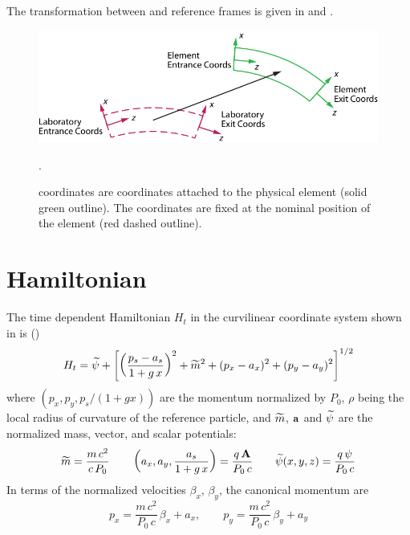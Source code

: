 The transformation between  and  reference frames is given in
 and .


\begin{figure}[tb]
  \centering
  \includegraphics[width=5in]{coord-offset.pdf}
  \caption[Element Coordinate System.]
  {
 coordinates are coordinates attached to the physical element (solid green outline). The
 coordinates are fixed at the nominal position of the element (red dashed outline).
  }
  \label{f:ele.coord}.
\end{figure}

\section{Hamiltonian}
\label{s:mag.hamiltonian}
The time dependent Hamiltonian $H_t$ in the curvilinear coordinate system shown
in  is (\cite{b:ruth})
\begin{equation}
  H_t = \widetilde\psi + \left[ \left( \frac{p_s - a_s}{1 + g\, x} \right)^2 + \widetilde m^2 + 
  (p_x - a_x)^2 + (p_y - a_y)^2 \right]^{1/2}
\end{equation}
where $(p_x, p_y, p_s/(1+gx))$ are the momentum normalized by $P_0$, $\rho$ being the local radius
of curvature of the reference particle, and $\widetilde m$, ${\bf a}$ and $\widetilde\psi$ are the normalized mass,
vector, and scalar potentials:
\begin{equation}
  \widetilde m = \frac{m \, c^2}{c \, P_0} \qquad
  \left( a_x, a_y, \frac{a_s}{1+g \, x} \right) = \frac{q \, {\bf A}}{P_0 \, c} \qquad 
  \widetilde\psi(x,y,z) = \frac{q \, \psi}{P_0 \, c}
  \label{mmccp}
\end{equation}
In terms of the normalized velocities $\beta_x$, $\beta_y$, the canonical momentum are
\begin{equation}
  p_x = \frac{m \, c^2}{P_0 \, c} \, \beta_x + a_x, \qquad 
  p_y = \frac{m \, c^2}{P_0 \, c} \, \beta_y + a_y
  \label{pmc2pc}
\end{equation}

